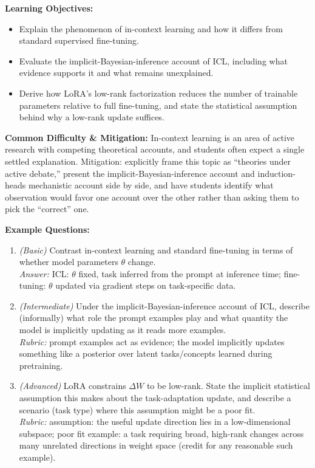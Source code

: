 \documentclass[11pt]{article}
\begin{document}
\textbf{Learning Objectives:}
\begin{itemize}
  \item Explain the phenomenon of in-context learning and how it differs from standard supervised fine-tuning.
  \item Evaluate the implicit-Bayesian-inference account of ICL, including what evidence supports it and what remains unexplained.
  \item Derive how LoRA's low-rank factorization reduces the number of trainable parameters relative to full fine-tuning, and state the statistical assumption behind why a low-rank update suffices.
\end{itemize}

\textbf{Common Difficulty \& Mitigation:} In-context learning is an area of active research with competing theoretical accounts, and students often expect a single settled explanation. Mitigation: explicitly frame this topic as ``theories under active debate,'' present the implicit-Bayesian-inference account and induction-heads mechanistic account side by side, and have students identify what observation would favor one account over the other rather than asking them to pick the ``correct'' one.

\textbf{Example Questions:}
\begin{enumerate}
  \item \textit{(Basic)} Contrast in-context learning and standard fine-tuning in terms of whether model parameters $\theta$ change. \\
  \textit{Answer:} ICL: $\theta$ fixed, task inferred from the prompt at inference time; fine-tuning: $\theta$ updated via gradient steps on task-specific data.
  \item \textit{(Intermediate)} Under the implicit-Bayesian-inference account of ICL, describe (informally) what role the prompt examples play and what quantity the model is implicitly updating as it reads more examples. \\
  \textit{Rubric:} prompt examples act as evidence; the model implicitly updates something like a posterior over latent tasks/concepts learned during pretraining.
  \item \textit{(Advanced)} LoRA constrains $\Delta W$ to be low-rank. State the implicit statistical assumption this makes about the task-adaptation update, and describe a scenario (task type) where this assumption might be a poor fit. \\
  \textit{Rubric:} assumption: the useful update direction lies in a low-dimensional subspace; poor fit example: a task requiring broad, high-rank changes across many unrelated directions in weight space (credit for any reasonable such example).
\end{enumerate}
\end{document}
